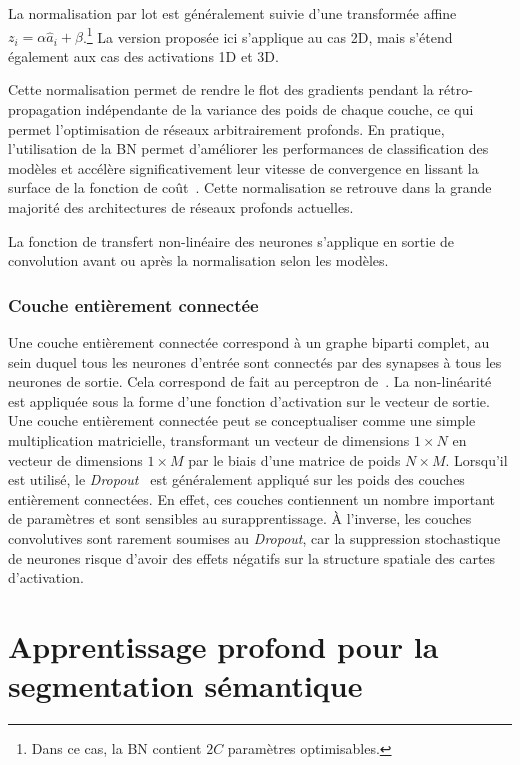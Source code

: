 La normalisation par lot est généralement suivie d'une transformée affine $z_i = \alpha \hat{a}_i + \beta$.\footnote{Dans ce cas, la \gls{BN} contient $2C$ paramètres optimisables.} La version proposée ici s'applique au cas 2D, mais s'étend également aux cas des activations 1D et 3D.

Cette normalisation permet de rendre le flot des gradients pendant la rétro-propagation indépendante de la variance des poids de chaque couche, ce qui permet l'optimisation de réseaux arbitrairement profonds. En pratique, l'utilisation de la \gls{BN} permet d'améliorer les performances de classification des modèles et accélère significativement leur vitesse de convergence en lissant la surface de la fonction de coût~\cite{santurkar_how_2018}. Cette normalisation se retrouve dans la grande majorité des architectures de réseaux profonds actuelles.

La fonction de transfert non-linéaire des neurones s'applique en sortie de convolution avant ou après la normalisation selon les modèles.

\subsubsection{Couche entièrement connectée}

Une couche entièrement connectée correspond à un graphe biparti complet, au sein duquel tous les neurones d'entrée sont connectés par des synapses à tous les neurones de sortie. Cela correspond de fait au perceptron de~\citet{rosenblatt_perceptron_1957}. La non-linéarité est appliquée sous la forme d'une fonction d'activation sur le vecteur de sortie. Une couche entièrement connectée peut se conceptualiser comme une simple multiplication matricielle, transformant un vecteur de dimensions $1\times{}N$ en vecteur de dimensions $1\times{}M$ par le biais d'une matrice de poids $N\times{}M$. Lorsqu'il est utilisé, le \emph{Dropout}~\cite{srivastava_dropout_2014} est généralement appliqué sur les poids des couches entièrement connectées. En effet, ces couches contiennent un nombre important de paramètres et sont sensibles au surapprentissage. À l'inverse, les couches convolutives sont rarement soumises au \emph{Dropout}, car la suppression stochastique de neurones risque d'avoir des effets négatifs sur la structure spatiale des cartes d'activation.

\section{Apprentissage profond pour la segmentation sémantique}

